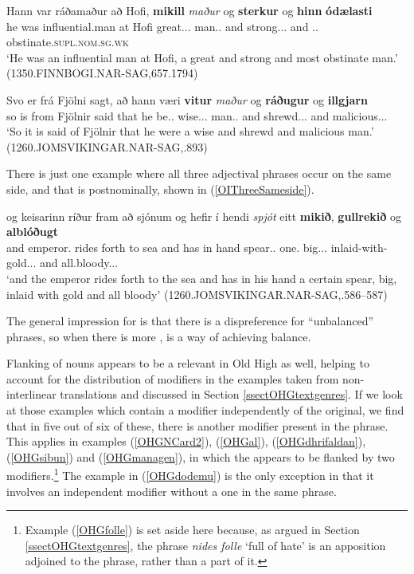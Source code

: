 \documentclass[output=paper,colorlinks,citecolor=brown,draft]{langscibook}
\begin{document}
\ea\label{OIFlankedthree}
\gll Hann var ráðamaður að Hofi, \textbf{mikill} \textit{maður} og \textbf{sterkur} og \textbf{hinn} \textbf{ódælasti}\\
he was influential.man at Hofi great.\NOM.\SG.\STR{} man.\NOM.\SG{} and strong.\NOM.\SG.\STR{} and \DEF.\NOM.\SG{} obstinate.\textsc{supl.nom.sg.wk}\\
\glt ‘He was an influential man at Hofi, a great and strong and most obstinate man.’ (1350.FINNBOGI.NAR-SAG,657.1794)
\z

\ea\label{OIFlankedthree2}
\gll Svo er frá Fjölni sagt, að hann væri \textbf{vitur} \textit{maður} og \textbf{ráðugur} og \textbf{illgjarn}\\
	      so is from Fjölnir said that he be.\PST.\SBJV{} wise.\NOM.\SG.\STR{} man.\NOM.\SG{} and shrewd.\NOM.\SG.\STR{} and malicious.\NOM.\SG.\STR{}\\
\glt ‘So it is said of Fjölnir  that he were a wise and shrewd and malicious man.’ (1260.JOMSVIKINGAR.NAR-SAG,.893)
\z

There is just one example where all three adjectival phrases occur on the same side, and that is postnominally, shown in (\ref{OIThreeSameside}).

\ea\label{OIThreeSameside}
\gll og keisarinn ríður fram að sjónum og hefir í hendi \textit{spjót} eitt \textbf{mikið}, \textbf{gullrekið} og \textbf{alblóðugt}\\
and emperor.\DEF{} rides forth to sea and has in hand spear.\ACC.\SG{} one.\ACC{} big.\ACC.\SG.\STR{} {inlaid-with-gold.\ACC.\SG.\STR{}} and all.bloody.\ACC.\SG.\STR{}\\
\glt ‘and the emperor rides forth to the sea and has in his hand a certain spear, big, inlaid with gold and all bloody’ (1260.JOMSVIKINGAR.NAR-SAG,.586--587)
\z

The general impression for  is that there is a dispreference for “unbalanced”  phrases, so when there is more ,  is a way of achieving balance.

Flanking of nouns appears to be a relevant  in Old High  as well, helping to account for the distribution of  modifiers in the examples taken from non-interlinear translations and discussed in Section \ref{ssectOHGtextgenres}. If we look at those examples which contain a  modifier independently of the  original, we find that in five out of six of these, there is another  modifier present in the  phrase. This applies in examples (\ref{OHGNCard2}), (\ref{OHGal}), (\ref{OHGdhrifaldan}), (\ref{OHGsibun}) and (\ref{OHGmanagen}), in which the  appears to be flanked by two modifiers.\footnote{Example (\ref{OHGfolle}) is set aside here because, as argued in Section \ref{ssectOHGtextgenres}, the  phrase \textit{nides folle} ‘full of hate' is an apposition adjoined to the  phrase, rather than a part of it.} The example in (\ref{OHGdodemu}) is the only exception in that it involves an independent  modifier without a  one in the same  phrase.
\end{document}
